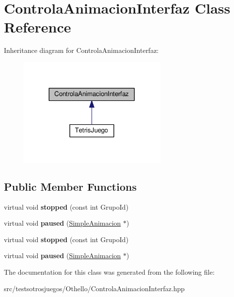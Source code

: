\hypertarget{class_controla_animacion_interfaz}{}\section{Controla\+Animacion\+Interfaz Class Reference}
\label{class_controla_animacion_interfaz}


Inheritance diagram for Controla\+Animacion\+Interfaz\+:
\nopagebreak
\begin{figure}[H]
\begin{center}
\leavevmode
\includegraphics[width=212pt]{class_controla_animacion_interfaz__inherit__graph}
\end{center}
\end{figure}
\subsection*{Public Member Functions}
\begin{DoxyCompactItemize}
\item 
virtual void {\bfseries stopped} (const int Grupo\+Id)\hypertarget{class_controla_animacion_interfaz_a926d0fbba78e151a01bd012e460fbd1d}{}\label{class_controla_animacion_interfaz_a926d0fbba78e151a01bd012e460fbd1d}

\item 
virtual void {\bfseries paused} (\hyperlink{class_simple_animacion}{Simple\+Animacion} $\ast$)\hypertarget{class_controla_animacion_interfaz_a90aa4c3fd3fba7adf01f310548a2b911}{}\label{class_controla_animacion_interfaz_a90aa4c3fd3fba7adf01f310548a2b911}

\item 
virtual void {\bfseries stopped} (const int Grupo\+Id)\hypertarget{class_controla_animacion_interfaz_a926d0fbba78e151a01bd012e460fbd1d}{}\label{class_controla_animacion_interfaz_a926d0fbba78e151a01bd012e460fbd1d}

\item 
virtual void {\bfseries paused} (\hyperlink{class_simple_animacion}{Simple\+Animacion} $\ast$)\hypertarget{class_controla_animacion_interfaz_a90aa4c3fd3fba7adf01f310548a2b911}{}\label{class_controla_animacion_interfaz_a90aa4c3fd3fba7adf01f310548a2b911}

\end{DoxyCompactItemize}


The documentation for this class was generated from the following file\+:\begin{DoxyCompactItemize}
\item 
src/testsotrosjuegos/\+Othello/Controla\+Animacion\+Interfaz.\+hpp\end{DoxyCompactItemize}
